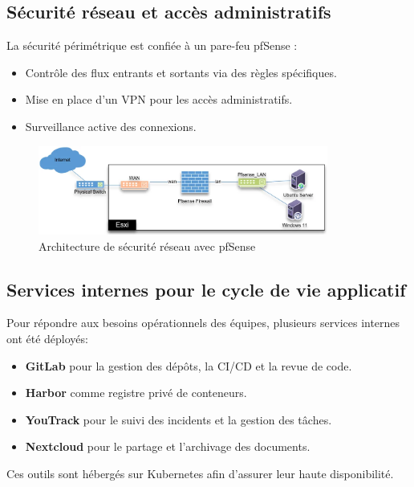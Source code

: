 \subsection{Sécurité réseau et accès administratifs}

La sécurité périmétrique est confiée à un pare-feu pfSense :
\begin{itemize}
	\item Contrôle des flux entrants et sortants via des règles spécifiques.
	\item Mise en place d’un VPN pour les accès administratifs.
	\item Surveillance active des connexions.
\end{itemize}

\begin{figure}[H]
	\centering
	\includegraphics[width=0.85\textwidth]{figures/pfsense-securite.png}
	\caption{Architecture de sécurité réseau avec pfSense}
\end{figure}

\subsection{Services internes pour le cycle de vie applicatif}

Pour répondre aux besoins opérationnels des équipes, plusieurs services internes ont été déployés:
\begin{itemize}
	\item \textbf{GitLab} pour la gestion des dépôts, la CI/CD et la revue de code.
	\item \textbf{Harbor} comme registre privé de conteneurs.
	\item \textbf{YouTrack} pour le suivi des incidents et la gestion des tâches.
	\item \textbf{Nextcloud} pour le partage et l’archivage des documents.
\end{itemize}

Ces outils sont hébergés sur Kubernetes afin d’assurer leur haute disponibilité.

